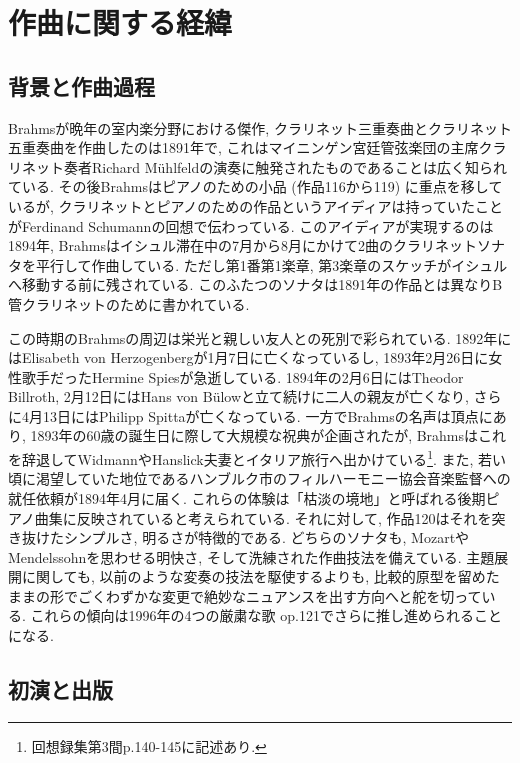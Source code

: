 
\chapter{作曲に関する経緯}

\section{背景と作曲過程}

Brahmsが晩年の室内楽分野における傑作, クラリネット三重奏曲とクラリネット五重奏曲を作曲したのは1891年で,
これはマイニンゲン宮廷管弦楽団の主席クラリネット奏者Richard Mühlfeldの演奏に触発されたものであることは広く知られている.
その後Brahmsはピアノのための小品 (作品116から119) に重点を移しているが,
クラリネットとピアノのための作品というアイディアは持っていたことがFerdinand Schumannの回想で伝わっている\cite{library}.
このアイディアが実現するのは1894年, Brahmsはイシュル滞在中の7月から8月にかけて2曲のクラリネットソナタを平行して作曲している\cite{compos}\cite{henle}.
ただし第1番第1楽章, 第3楽章のスケッチがイシュルへ移動する前に残されている\cite{library}\cite{henle}.
このふたつのソナタは1891年の作品とは異なりB管クラリネットのために書かれている.

この時期のBrahmsの周辺は栄光と親しい友人との死別で彩られている.
1892年にはElisabeth von Herzogenbergが1月7日に亡くなっているし, 1893年2月26日に女性歌手だったHermine Spiesが急逝している.
1894年の2月6日にはTheodor Billroth, 2月12日にはHans von Bülowと立て続けに二人の親友が亡くなり, さらに4月13日にはPhilipp Spittaが亡くなっている.
一方でBrahmsの名声は頂点にあり, 1893年の60歳の誕生日に際して大規模な祝典が企画されたが,
Brahmsはこれを辞退してWidmannやHanslick夫妻とイタリア旅行へ出かけている\footnote{回想録集第3間p.140-145に記述あり.}.
また, 若い頃に渇望していた地位であるハンブルク市のフィルハーモニー協会音楽監督への就任依頼が1894年4月に届く.
これらの体験は「枯淡の境地」と呼ばれる後期ピアノ曲集に反映されていると考えられている.
それに対して, 作品120はそれを突き抜けたシンプルさ, 明るさが特徴的である.
どちらのソナタも, MozartやMendelssohnを思わせる明快さ, そして洗練された作曲技法を備えている.
主題展開に関しても, 以前のような変奏の技法を駆使するよりも,
比較的原型を留めたままの形でごくわずかな変更で絶妙なニュアンスを出す方向へと舵を切っている.
これらの傾向は1996年の4つの厳粛な歌 op.121でさらに推し進められることになる.


\section{初演と出版}

